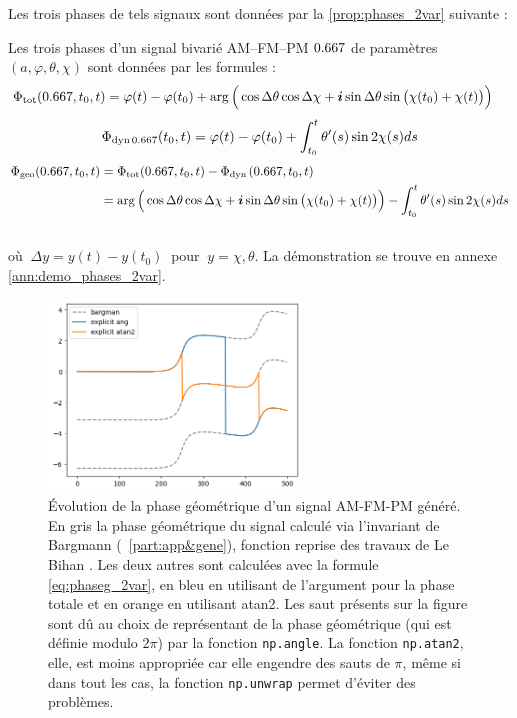 Les trois phases de tels signaux sont données par la \cref{prop:phases_2var} suivante :
\begin{proposition}\label{prop:phases_2var}
	Les trois phases d'un signal bivarié AM--FM--PM $\x$ 	de paramètres $(a,\varphi,\theta,\chi)$ sont données par les formules :
	\begin{equation}\label{eq:phaset_2var}
		\begin{aligned}
			\phaset(\x,t_0,t) &= \varphi(t)-\varphi(t_0) + \arg\Big(\cos\Delta\theta \cos\Delta\chi + \i\sin\Delta\theta \sin\big(\chi(t_0)+\chi(t)\big)\Big)
		\end{aligned}
	\end{equation}
	\begin{equation}\label{eq:phased_2var}
		\phased[\x](t_0,t) = \varphi(t) -\varphi(t_0) + \int_{t_0}^t\theta'(s) \sin2\chi(s) ds
	\end{equation}
	\begin{equation}\label{eq:phaseg_2var}
		\begin{aligned}
			\phaseg(\x,t_0,t) &= \phaset(\x,t_0,t) - \phased(\x,t_0,t) \\
			&= \arg\Big(\cos\Delta\theta \cos\Delta\chi + \i\sin\Delta\theta \sin\big(\chi(t_0)+\chi(t)\big)\Big) - \int_{t_0}^t\theta'(s) \sin2\chi(s) ds
		\end{aligned}
	\end{equation}
	\\
	où $\ \Delta y = y(t) - y(t_0)\ $ pour $\ y = \chi, \theta$. La démonstration se trouve en annexe \ref{ann:demo_phases_2var}.
\end{proposition}
\skipl

\begin{figure}[h]
	\includegraphics[width = 0.6\textwidth]{fig/part-1/premier_resultat}
	\caption[ Évolution de la phase géométrique d'un signal AM-FM-PM]{Évolution de la phase géométrique d'un signal AM-FM-PM généré. En gris la phase géométrique du signal calculé via l'invariant de Bargmann (\cf~\cref{part:app&gene}), fonction reprise des travaux de Le Bihan \etal \cite{le_bihan_modephysiques_2023,le_bihan_geometric_2024}. Les deux autres sont calculées avec la formule \cref{eq:phaseg_2var}, en bleu en utilisant de l'argument pour la phase totale et en orange en utilisant atan2. Les saut présents sur la figure sont dû au choix de représentant de la phase géométrique (qui est définie modulo $2\pi$)  par la fonction \texttt{np.angle}. La fonction \texttt{np.atan2}, elle, est moins appropriée car elle engendre des sauts de $\pi$, même si dans tout les cas, la fonction \texttt{np.unwrap} permet d'éviter des problèmes.}
\end{figure}

